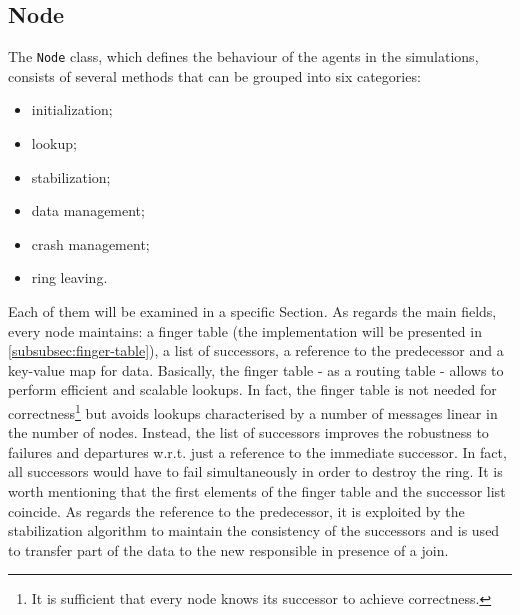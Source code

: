 \documentclass[11pt,twocolumn,letterpaper]{article}
\begin{document}
	\subsection{Node}
	\label{subsec:node}
	The \texttt{Node} class, which defines the behaviour of the agents in the simulations, consists of several methods that can be grouped into six categories:
	\vspace{-2pt}
	\begin{itemize}
		\itemsep0pt
		\item initialization;
		\item lookup;
		\item stabilization;
		\item data management;
		\item crash management;
		\item ring leaving.
	\end{itemize}
	\vspace{-1pt}
	Each of them will be examined in a specific Section. As regards the main fields, every node maintains: a finger table (the implementation will be presented in \cref{subsubsec:finger-table}), a list of successors, a reference to the predecessor and a key-value map for data. \newline
	Basically, the finger table - as a routing table - allows to perform efficient and scalable lookups. In fact, the finger table is not needed for correctness\footnote{It is sufficient that every node knows its successor to achieve correctness.} but avoids lookups characterised by a number of messages linear in the number of nodes. \newline
	Instead, the list of successors improves the robustness to failures and departures w.r.t. just a reference to the immediate successor. In fact, all successors would have to fail simultaneously in order to destroy the ring. It is worth mentioning that the first elements of the finger table and the successor list coincide. \newline
	As regards the reference to the predecessor, it is exploited by the stabilization algorithm to maintain the consistency of the successors and is used to transfer part of the data to the new responsible in presence of a join.
	
\end{document}
